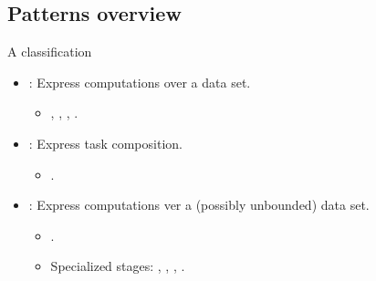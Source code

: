 \subsection{Patterns overview}

\begin{frame}[t]{A classification}
\begin{itemize}
  \item {}: Express computations over a data set.
    \begin{itemize}
      \item {}, , , .
    \end{itemize}

  \vfill\pause
  \item {}: Express task composition.
    \begin{itemize}
      \item {}.
    \end{itemize}

  \vfill\pause
  \item {}: Express computations ver a (possibly unbounded) data set.
    \begin{itemize}
      \item {}.
      \item Specialized stages: , , 
            , .
    \end{itemize}
\end{itemize}
\end{frame}
